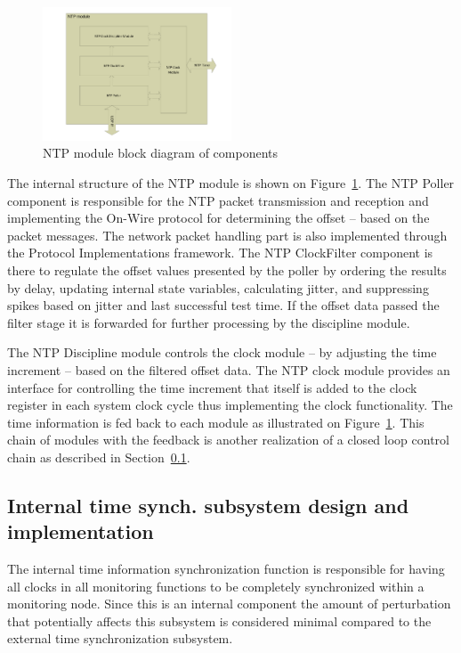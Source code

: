 \documentclass[article]{IEEEtran}
\begin{document}
\begin{figure}[!htb]
    \centering
    \includegraphics[width=0.5\textwidth]{figures_raw/ntp-sketch.pdf}
    \caption{NTP module block diagram of components}
    \label{fig:ntp-impl}
\end{figure}

The internal structure of the NTP module is shown on Figure~\ref{fig:ntp-impl}. The NTP Poller component is responsible
for the NTP packet transmission and reception and implementing the On-Wire protocol
for determining the offset  -- based on the packet messages. The network packet handling part is also implemented
through the Protocol Implementations framework. The NTP ClockFilter component is there to regulate the offset values
presented by the poller by ordering the results by delay, updating internal state variables, calculating jitter, and
suppressing spikes based on jitter and last successful test time. If the offset data passed the filter stage it is
forwarded for further processing by the discipline module.

The NTP Discipline module controls the clock module -- by adjusting the time increment -- based on the filtered offset
data. The NTP clock module provides an interface for controlling the time increment that itself is added to the clock
register in each system clock cycle thus
implementing the clock functionality. The time information is fed back to each module as illustrated on
Figure~\ref{fig:ntp-impl}.
This chain of modules with the feedback is another realization of a closed loop control chain as described in
Section~\ref{sec:Internal-Impl}.

\subsection{Internal time synch. subsystem design and implementation}\label{sec:Internal-Impl}

The internal time information synchronization function is responsible for having all clocks in all monitoring functions
to be completely synchronized within a monitoring node. Since this is an internal component the amount of perturbation
that potentially affects this subsystem is considered minimal compared to the external time synchronization subsystem.
\end{document}
